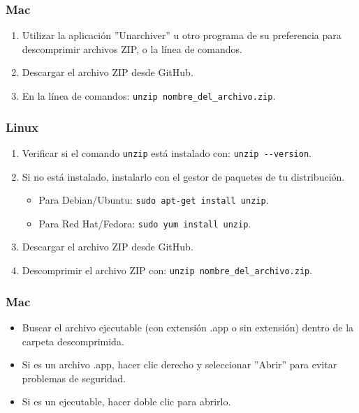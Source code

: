 \subsubsection*{Mac}

\begin{enumerate}[label=\arabic*.-]
    \item Utilizar la aplicación ''Unarchiver'' u otro programa de su preferencia para descomprimir archivos ZIP, o la línea de comandos.
    \item Descargar el archivo ZIP desde GitHub.
    \item En la línea de comandos: \verb|unzip nombre_del_archivo.zip|.
\end{enumerate}

\subsubsection*{Linux}

\begin{enumerate}[label=\arabic*.-]
    \item Verificar si el comando \verb|unzip| está instalado con: \verb|unzip --version|.
    \item Si no está instalado, instalarlo con el gestor de paquetes de tu distribución.
        \begin{itemize}
            \item Para Debian/Ubuntu: \verb|sudo apt-get install unzip|.
            \item Para Red Hat/Fedora: \verb|sudo yum install unzip|.
        \end{itemize}
    \item Descargar el archivo ZIP desde GitHub.
    \item Descomprimir el archivo ZIP con: \verb|unzip nombre_del_archivo.zip|.
\end{enumerate}

\subsubsection*{Mac}

\begin{itemize}
    \item Buscar el archivo ejecutable (con extensión .app o sin extensión) dentro de la carpeta descomprimida.
    \item Si es un archivo .app, hacer clic derecho y seleccionar ''Abrir'' para evitar problemas de seguridad.
    \item Si es un ejecutable, hacer doble clic para abrirlo.
\end{itemize}

